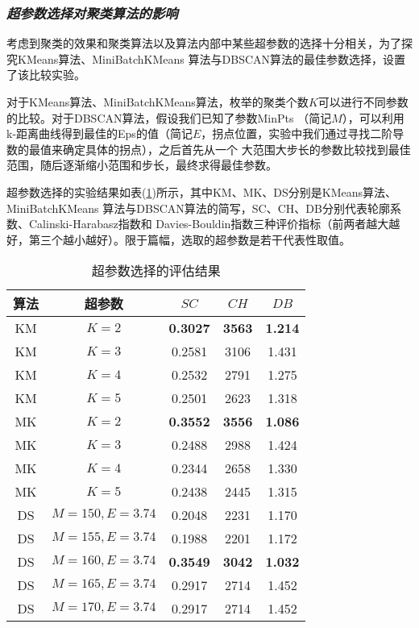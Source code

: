 \documentclass{acm_proc_article-sp}
\begin{document}
\subsubsection{\textit{超参数选择对聚类算法的影响}}

考虑到聚类的效果和聚类算法以及算法内部中某些超参数的选择十分相关，为了探究KMeans算法、MiniBatchKMeans
算法与DBSCAN算法的最佳参数选择，设置了该比较实验。

对于KMeans算法、MiniBatchKMeans算法，枚举的聚类个数$K$可以进行不同参数的比较。对于DBSCAN算法，假设我们已知了参数MinPts
（简记$M$），可以利用k-距离曲线得到最佳的Eps的值（简记$E$，拐点位置，实验中我们通过寻找二阶导数的最值来确定具体的拐点），之后首先从一个
大范围大步长的参数比较找到最佳范围，随后逐渐缩小范围和步长，最终求得最佳参数。

超参数选择的实验结果如表(\ref{ARG})所示，其中KM、MK、DS分别是KMeans算法、MiniBatchKMeans
算法与DBSCAN算法的简写，SC、CH、DB分别代表轮廓系数、Calinski-Harabasz指数和
Davies-Bouldin指数三种评价指标（前两者越大越好，第三个越小越好）。限于篇幅，选取的超参数是若干代表性取值。

\begin{table}[!htb]
\small
\centering
\caption{超参数选择的评估结果}
\begin{tabular}{@{}ccccc@{}}\toprule
算法     & 超参数 & $\mathit{SC}$ & $\mathit{CH}$ & $\mathit{DB}$  \\ \midrule
KM & $K=2$   & \textbf{0.3027} & \textbf{3563} & \textbf{1.214}\\
KM & $K=3$   & 0.2581 & 3106 & 1.431\\
KM & $K=4$   & 0.2532 & 2791 & 1.275\\
KM & $K=5$   & 0.2501 & 2623 & 1.318\\\midrule
MK & $K=2$   & \textbf{0.3552} & \textbf{3556} & \textbf{1.086}\\
MK & $K=3$   & 0.2488 & 2988 & 1.424\\
MK & $K=4$   & 0.2344 & 2658 & 1.330\\
MK & $K=5$   & 0.2438 & 2445 & 1.315\\\midrule  
DS & $M=150,E=3.74$    & 0.2048 & 2231 & 1.170\\
DS & $M=155,E=3.74$    & 0.1988 & 2201 & 1.172\\
DS & $M=160,E=3.74$    & \textbf{0.3549} & \textbf{3042} & \textbf{1.032}\\
DS & $M=165,E=3.74$    & 0.2917 & 2714 & 1.452\\
DS & $M=170,E=3.74$    & 0.2917 & 2714 & 1.452\\\bottomrule
\end{tabular}
\label{ARG}
\end{table}
\end{document}
